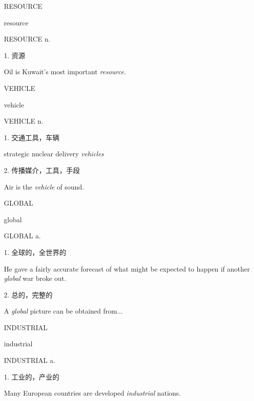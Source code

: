 \begin{flashcard}{
RESOURCE

resource
}
\begin{center}
RESOURCE n. 
\end{center}
1. 资源

Oil is Kuwait's most important \textit{resource}.

\end{flashcard}
\begin{flashcard}{
VEHICLE

vehicle
}
\begin{center}
VEHICLE n. 
\end{center}
1. 交通工具，车辆

strategic nuclear delivery \textit{vehicles}

2. 传播媒介，工具，手段

Air is the \textit{vehicle} of sound.

\end{flashcard}
\begin{flashcard}{
GLOBAL

global
}
\begin{center}
GLOBAL a. 
\end{center}
1. 全球的，全世界的

He gave a fairly accurate forecast of what might be expected to happen if another \textit{global} war broke out.

2. 总的，完整的

A \textit{global} picture can be obtained from...

\end{flashcard}
\begin{flashcard}{
INDUSTRIAL

industrial
}
\begin{center}
INDUSTRIAL a. 
\end{center}
1. 工业的，产业的

Many European countries are developed \textit{industrial} nations.

\end{flashcard}
